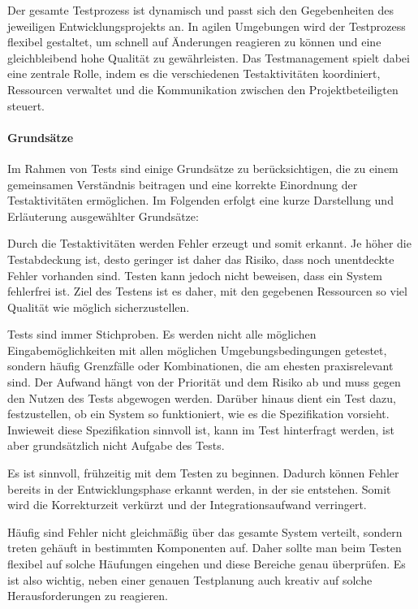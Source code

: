 Der gesamte Testprozess ist dynamisch und passt sich den Gegebenheiten des jeweiligen Entwicklungsprojekts an. In agilen Umgebungen wird der Testprozess flexibel gestaltet, um schnell auf Änderungen reagieren zu können und eine gleichbleibend hohe Qualität zu gewährleisten. Das Testmanagement spielt dabei eine zentrale Rolle, indem es die verschiedenen Testaktivitäten koordiniert, Ressourcen verwaltet und die Kommunikation zwischen den Projektbeteiligten steuert. 

\paragraph{Grundsätze}
Im Rahmen von Tests sind einige Grundsätze zu berücksichtigen, die zu einem gemeinsamen Verständnis beitragen und eine korrekte Einordnung der Testaktivitäten ermöglichen. Im Folgenden erfolgt eine kurze Darstellung und Erläuterung ausgewählter Grundsätze:

Durch die Testaktivitäten werden Fehler erzeugt und somit erkannt. Je höher die Testabdeckung ist, desto geringer ist daher das Risiko, dass noch unentdeckte Fehler vorhanden sind. Testen kann jedoch nicht beweisen, dass ein System fehlerfrei ist. Ziel des Testens ist es daher, mit den gegebenen Ressourcen so viel Qualität wie möglich sicherzustellen.

Tests sind immer Stichproben. Es werden nicht alle möglichen Eingabemöglichkeiten mit allen möglichen Umgebungsbedingungen getestet, sondern häufig Grenzfälle oder Kombinationen, die am ehesten praxisrelevant sind. Der Aufwand hängt von der Priorität und dem Risiko ab und muss gegen den Nutzen des Tests abgewogen werden. Darüber hinaus dient ein Test dazu, festzustellen, ob ein System so funktioniert, wie es die Spezifikation vorsieht. Inwieweit diese Spezifikation sinnvoll ist, kann im Test hinterfragt werden, ist aber grundsätzlich nicht Aufgabe des Tests.

Es ist sinnvoll, frühzeitig mit dem Testen zu beginnen. Dadurch können Fehler bereits in der Entwicklungsphase erkannt werden, in der sie entstehen. Somit wird die Korrekturzeit verkürzt und der Integrationsaufwand verringert.

Häufig sind Fehler nicht gleichmäßig über das gesamte System verteilt, sondern treten gehäuft in bestimmten Komponenten auf. Daher sollte man beim Testen flexibel auf solche Häufungen eingehen und diese Bereiche genau überprüfen. Es ist also wichtig, neben einer genauen Testplanung auch kreativ auf solche Herausforderungen zu reagieren.

